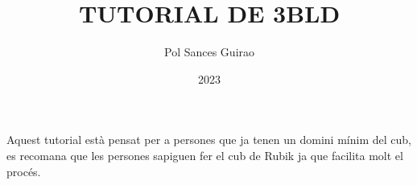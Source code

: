 \documentclass{article}
\title{\textbf{TUTORIAL DE 3BLD}}
\author{Pol Sances Guirao}
\date{2023}
\begin{document}
\thispagestyle{empty}
\maketitle
\newpage

\thispagestyle{empty}
\tableofcontents
\newpage

\thispagestyle{empty}
Aquest tutorial està pensat per a persones que ja tenen un domini mínim del cub, es recomana que les persones sapiguen fer el cub de Rubik ja que facilita molt el procés.


\newpage


\newpage


\newpage


\newpage

\end{document}
